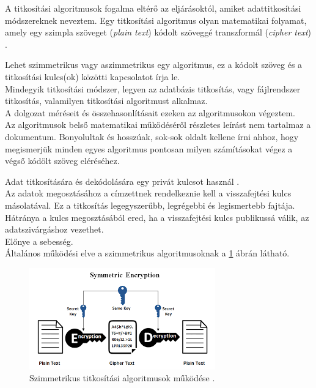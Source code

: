 

A titkosítási algoritmusok fogalma eltérő az eljárásoktól, amiket adattitkosítási módszereknek neveztem. Egy titkosítási algoritmus olyan matematikai folyamat, amely egy szimpla szöveget (\textit{plain text}) kódolt szöveggé transzformál (\textit{cipher text}) \cite{thakkar2022blog}.

Lehet szimmetrikus vagy aszimmetrikus egy algoritmus, ez a kódolt szöveg és a titkosítási kulcs(ok) közötti kapcsolatot írja le.
\vspace{5pt}\\Mindegyik titkosítási módszer, legyen az adatbázis titkosítás, vagy fájlrendszer titkosítás, valamilyen titkosítási algoritmust alkalmaz.
\\A dolgozat méréseit és összehasonlításait ezeken az algoritmusokon végeztem.
\vspace{5pt}\\Az algoritmusok belső matematikai működéséről részletes leírást nem tartalmaz a dokumentum. Bonyolultak és hosszúak, sok-sok oldalt kellene írni ahhoz, hogy megismerjük minden egyes algoritmus pontosan milyen számításokat végez a végső kódölt szöveg eléréséhez.
 
\noindent Adat titkosítására és dekódolására egy privát kulcsot használ \cite{abd2010evaluating}.
\\Az adatok megosztásához a címzettnek rendelkeznie kell a visszafejtési kulcs másolatával. Ez a titkosítás legegyszerűbb, legrégebbi és legismertebb fajtája.
\\Hátránya a kulcs megosztásából ered, ha a visszafejtési kulcs publikussá válik, az adatszivárgáshoz vezethet.
\\Előnye a sebesség. \newline
\\Általános működési elve a szimmetrikus algoritmusoknak a \ref{fig:sym_encryption} ábrán látható.
\begin{figure}[H]
	\centering
	\includegraphics[scale=0.75]{images/sym.png}
	\caption{Szimmetrikus titkosítási algoritmusok működése \cite{ssl2buywiki}.}
	\label{fig:sym_encryption}
\end{figure}

